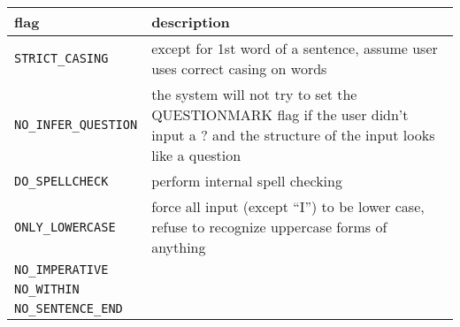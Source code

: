 \documentclass[]{article}
\begin{document}
\begin{longtable}[]{@{}ll@{}}
\toprule
\begin{minipage}[b]{0.07\columnwidth}\raggedright\strut
flag\strut
\end{minipage} & \begin{minipage}[b]{0.10\columnwidth}\raggedright\strut
description\strut
\end{minipage}\tabularnewline
\midrule
\endhead
\begin{minipage}[t]{0.07\columnwidth}\raggedright\strut
\texttt{STRICT\_CASING}\strut
\end{minipage} & \begin{minipage}[t]{0.10\columnwidth}\raggedright\strut
except for 1st word of a sentence, assume user uses correct casing on
words\strut
\end{minipage}\tabularnewline
\begin{minipage}[t]{0.07\columnwidth}\raggedright\strut
\texttt{NO\_INFER\_QUESTION}\strut
\end{minipage} & \begin{minipage}[t]{0.10\columnwidth}\raggedright\strut
the system will not try to set the QUESTIONMARK flag if the user didn't
input a ? and the structure of the input looks like a question\strut
\end{minipage}\tabularnewline
\begin{minipage}[t]{0.07\columnwidth}\raggedright\strut
\texttt{DO\_SPELLCHECK}\strut
\end{minipage} & \begin{minipage}[t]{0.10\columnwidth}\raggedright\strut
perform internal spell checking\strut
\end{minipage}\tabularnewline
\begin{minipage}[t]{0.07\columnwidth}\raggedright\strut
\texttt{ONLY\_LOWERCASE}\strut
\end{minipage} & \begin{minipage}[t]{0.10\columnwidth}\raggedright\strut
force all input (except ``I'') to be lower case, refuse to recognize
uppercase forms of anything\strut
\end{minipage}\tabularnewline
\begin{minipage}[t]{0.07\columnwidth}\raggedright\strut
\texttt{NO\_IMPERATIVE}\strut
\end{minipage} & \begin{minipage}[t]{0.10\columnwidth}\raggedright\strut
\strut
\end{minipage}\tabularnewline
\begin{minipage}[t]{0.07\columnwidth}\raggedright\strut
\texttt{NO\_WITHIN}\strut
\end{minipage} & \begin{minipage}[t]{0.10\columnwidth}\raggedright\strut
\strut
\end{minipage}\tabularnewline
\begin{minipage}[t]{0.07\columnwidth}\raggedright\strut
\texttt{NO\_SENTENCE\_END}\strut
\end{minipage} & \begin{minipage}[t]{0.10\columnwidth}\raggedright\strut
\strut
\end{minipage}\tabularnewline
\bottomrule
\end{longtable}
\end{document}
